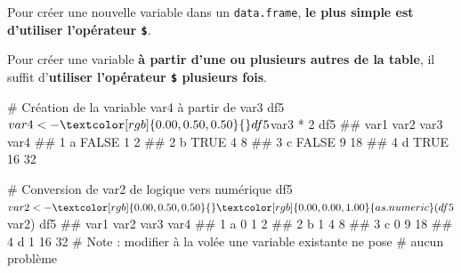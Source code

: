 \documentclass[12pt,twosided, notitlepage]{book}
\newenvironment{Shaded}{}{}
\newcommand{\KeywordTok}[1]{\textcolor[rgb]{0.00,0.00,1.00}{#1}}
\newcommand{\DataTypeTok}[1]{#1}
\newcommand{\DecValTok}[1]{#1}
\newcommand{\StringTok}[1]{\textcolor[rgb]{0.00,0.50,0.50}{#1}}
\newcommand{\CommentTok}[1]{\textcolor[rgb]{0.00,0.50,0.00}{#1}}
\newcommand{\OtherTok}[1]{\textcolor[rgb]{1.00,0.25,0.00}{#1}}
\newcommand{\OperatorTok}[1]{#1}
\newcommand{\NormalTok}[1]{#1}
\renewenvironment{Shaded}{\begin{snugshade}}{\end{snugshade}}
\begin{document}
Pour créer une nouvelle variable dans un \texttt{data.frame}, \textbf{le
plus simple est d'utiliser l'opérateur \texttt{\$}}. \index{\texttt{\$}}

\begin{Shaded}
\end{Shaded}

Pour créer une variable \textbf{à partir d'une ou plusieurs autres de la
table}, il suffit d'\textbf{utiliser l'opérateur \texttt{\$} plusieurs
fois}.

\begin{Shaded}
\begin{Highlighting}[]
\CommentTok{# Création de la variable var4 à partir de var3}
\NormalTok{df5}\OperatorTok{$}\NormalTok{var4 <-}\StringTok{ }\NormalTok{df5}\OperatorTok{$}\NormalTok{var3 }\OperatorTok{*}\StringTok{ }\DecValTok{2}
\NormalTok{df5}
\NormalTok{  ##   var1  var2 var3 var4}
\NormalTok{  ## 1    a FALSE    1    2}
\NormalTok{  ## 2    b  TRUE    4    8}
\NormalTok{  ## 3    c FALSE    9   18}
\NormalTok{  ## 4    d  TRUE   16   32}

\CommentTok{# Conversion de var2 de logique vers numérique}
\NormalTok{df5}\OperatorTok{$}\NormalTok{var2 <-}\StringTok{ }\KeywordTok{as.numeric}\NormalTok{(df5}\OperatorTok{$}\NormalTok{var2)}
\NormalTok{df5}
\NormalTok{  ##   var1 var2 var3 var4}
\NormalTok{  ## 1    a    0    1    2}
\NormalTok{  ## 2    b    1    4    8}
\NormalTok{  ## 3    c    0    9   18}
\NormalTok{  ## 4    d    1   16   32}
\CommentTok{# Note : modifier à la volée une variable existante ne pose }
\CommentTok{# aucun problème}
\end{Highlighting}
\end{Shaded}
\end{document}
